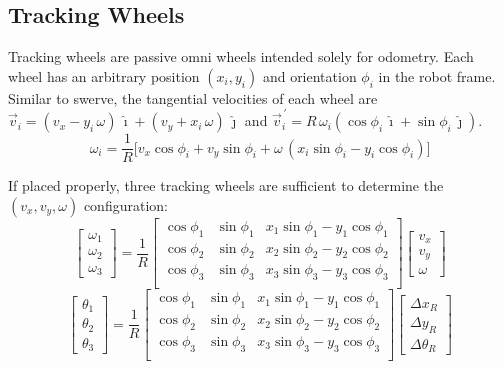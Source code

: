 \documentclass{article}
\newcommand{\pvec}[1]{\vec{#1}^{\,\prime}}
\begin{document}
\subsection{Tracking Wheels}
Tracking wheels are passive omni wheels intended solely for odometry. Each wheel has an arbitrary position $(x_i, y_i)$ and orientation $\phi_i$ in the robot frame. Similar to swerve, the tangential velocities of each wheel are $\vec{v}_i = (v_x - y_i \, \omega) \, \hat{\imath} + (v_y + x_i \, \omega) \, \hat{\jmath}$ and $\pvec{v}_i = R \, \omega_i (\operatorname{cos} \phi_i \, \hat{\imath} + \operatorname{sin} \phi_i \, \hat{\jmath})$. 
$$
    \omega_i = \frac{1}{R}\Big[v_x \operatorname{cos} \phi_i + v_y \operatorname{sin} \phi_i + \omega \, (x_i \operatorname{sin} \phi_i - y_i \operatorname{cos} \phi_i)\Big]
$$

If placed properly, three tracking wheels are sufficient to determine the $(v_x, v_y, \omega)$ configuration:
$$
\begin{bmatrix}
    \omega_1\\
    \omega_2\\
    \omega_3
\end{bmatrix}
=
\frac{1}{R}
\begin{bmatrix}
    \operatorname{cos} \phi_1 & \operatorname{sin} \phi_1 & x_1 \operatorname{sin} \phi_1 - y_1 \operatorname{cos} \phi_1 \\
    \operatorname{cos} \phi_2 & \operatorname{sin} \phi_2 & x_2 \operatorname{sin} \phi_2 - y_2 \operatorname{cos} \phi_2 \\
    \operatorname{cos} \phi_3 & \operatorname{sin} \phi_3 & x_3 \operatorname{sin} \phi_3 - y_3 \operatorname{cos} \phi_3 \\
\end{bmatrix}
\begin{bmatrix}
    v_x\\
    v_y\\
    \omega
\end{bmatrix}
$$
$$
\begin{bmatrix}
    \theta_1\\
    \theta_2\\
    \theta_3
\end{bmatrix}
=
\frac{1}{R}
\begin{bmatrix}
    \operatorname{cos} \phi_1 & \operatorname{sin} \phi_1 & x_1 \operatorname{sin} \phi_1 - y_1 \operatorname{cos} \phi_1 \\
    \operatorname{cos} \phi_2 & \operatorname{sin} \phi_2 & x_2 \operatorname{sin} \phi_2 - y_2 \operatorname{cos} \phi_2 \\
    \operatorname{cos} \phi_3 & \operatorname{sin} \phi_3 & x_3 \operatorname{sin} \phi_3 - y_3 \operatorname{cos} \phi_3 \\
\end{bmatrix}
\begin{bmatrix}
    \Delta x_R\\
    \Delta y_R\\
    \Delta \theta_R
\end{bmatrix}
$$
\end{document}
